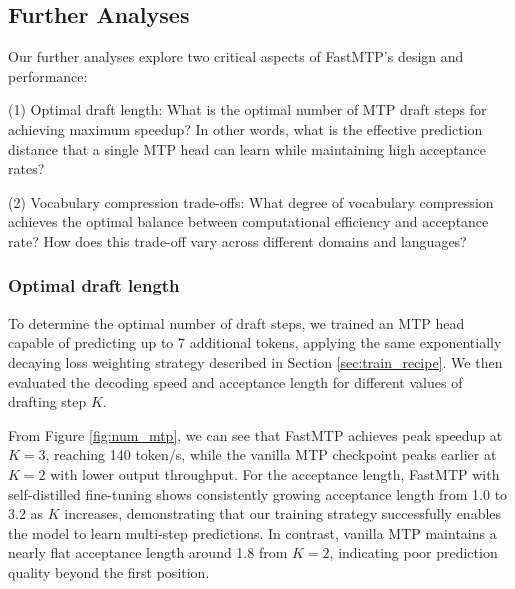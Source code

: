 \documentclass{article} %
\begin{document}

\subsection{Further Analyses}

Our further analyses explore two critical aspects of FastMTP's design and performance:

(1) Optimal draft length: What is the optimal number of MTP draft steps for achieving maximum speedup? In other words, what is the effective prediction distance that a single MTP head can learn while maintaining high acceptance rates?

(2) Vocabulary compression trade-offs: What degree of vocabulary compression achieves the optimal balance between computational efficiency and acceptance rate? How does this trade-off vary across different domains and languages?

\subsubsection{Optimal draft length} \label{sec:draft_len}

To determine the optimal number of draft steps, we trained an MTP head capable of predicting up to 7 additional tokens, applying the same exponentially decaying loss weighting strategy described in Section \ref{sec:train_recipe}. We then evaluated the decoding speed and acceptance length for different values of drafting step $K$.

From Figure \ref{fig:num_mtp}, we can see that FastMTP achieves peak speedup at $K=3$, reaching 140 token/s, while the vanilla MTP checkpoint peaks earlier at $K=2$ with lower output throughput. For the acceptance length, FastMTP with self-distilled fine-tuning shows consistently growing acceptance length from 1.0 to 3.2 as $K$ increases, demonstrating that our training strategy successfully enables the model to learn multi-step predictions. In contrast, vanilla MTP maintains a nearly flat acceptance length around 1.8 from $K=2$, indicating poor prediction quality beyond the first position.
\end{document}
